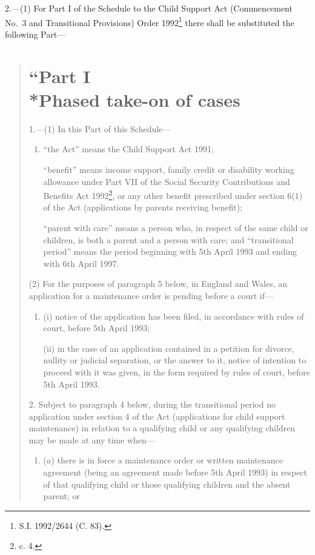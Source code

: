 \documentclass[a4paper]{article}
\begin{document}
2.—(1)  For Part I of the Schedule to the Child Support Act (Commencement No.\ 3 and Transitional Provisions) Order 1992\footnote{\frenchspacing S.I. 1992/2644 (C. 83).} there shall be substituted the following Part—
\begin{quotation}
\section*{``Part I\\*Phased take-on of cases}

1.—(1)  In this Part of this Schedule—
\begin{enumerate}\item[]
“the Act” means the Child Support Act 1991;

“benefit” means income support, family credit or disability working allowance under Part VII of the Social Security Contributions and Benefits Act 1992\footnote{ c. 4.}, or any other benefit prescribed under section 6(1) of the Act (applications by parents receiving benefit);

“parent with care” means a person who, in respect of the same child or children, is both a parent and a person with care; and
“transitional period” means the period beginning with 5th April 1993 and ending with 6th April 1997.
\end{enumerate}

(2) For the purposes of paragraph 5 below, in England and Wales, an application for a maintenance order is pending before a court if—
\begin{enumerate}\item[]
(i) notice of the application has been filed, in accordance with rules of court, before 5th April 1993;

(ii) in the case of an application contained in a petition for divorce, nullity or judicial separation, or the answer to it, notice of intention to proceed with it was given, in the form required by rules of court, before 5th April 1993.
\end{enumerate}

\medskip

2.  Subject to paragraph 4 below, during the transitional period no application under section 4 of the Act (applications for child support maintenance) in relation to a qualifying child or any qualifying children may be made at any time when—
\begin{enumerate}\item[]
($a$) there is in force a maintenance order or written maintenance agreement (being an agreement made before 5th April 1993) in respect of that qualifying child or those qualifying children and the absent parent; or


\end{enumerate}
\end{quotation}
\end{document}
